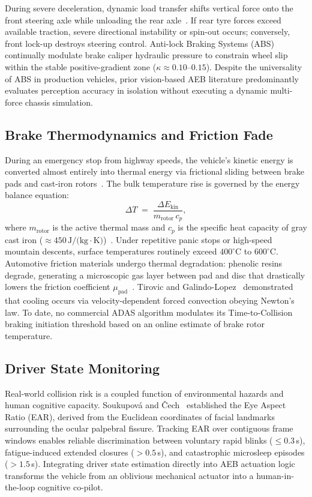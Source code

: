 \documentclass[3p,twocolumn]{elsarticle}
\begin{document}
During severe deceleration, dynamic load transfer shifts vertical force onto the front steering axle while unloading the rear axle~\cite{rajamani2011}. If rear tyre forces exceed available traction, severe directional instability or spin-out occurs; conversely, front lock-up destroys steering control. Anti-lock Braking Systems (ABS) continually modulate brake caliper hydraulic pressure to constrain wheel slip within the stable positive-gradient zone ($\kappa \approx 0.10$--$0.15$). Despite the universality of ABS in production vehicles, prior vision-based AEB literature predominantly evaluates perception accuracy in isolation without executing a dynamic multi-force chassis simulation.

\subsection{Brake Thermodynamics and Friction Fade}
During an emergency stop from highway speeds, the vehicle's kinetic energy is converted almost entirely into thermal energy via frictional sliding between brake pads and cast-iron rotors~\cite{day2014}. The bulk temperature rise is governed by the energy balance equation:
\begin{equation}
  \Delta T \;=\; \frac{\Delta E_{\text{kin}}}{m_{\text{rotor}}\,c_p},
  \label{eq:heat_energy}
\end{equation}
where $m_{\text{rotor}}$ is the active thermal mass and $c_p$ is the specific heat capacity of gray cast iron ($\approx 450\,\text{J/(kg}\cdot\text{K)}$)~\cite{tirovic2007}. Under repetitive panic stops or high-speed mountain descents, surface temperatures routinely exceed $400^\circ\text{C}$ to $600^\circ\text{C}$. Automotive friction materials undergo thermal degradation: phenolic resins degrade, generating a microscopic gas layer between pad and disc that drastically lowers the friction coefficient $\mu_{\text{pad}}$~\cite{limpert2011}. Tirovic and Galindo-Lopez~\cite{tirovic2007} demonstrated that cooling occurs via velocity-dependent forced convection obeying Newton's law. To date, no commercial ADAS algorithm modulates its Time-to-Collision braking initiation threshold based on an online estimate of brake rotor temperature.

\subsection{Driver State Monitoring}
Real-world collision risk is a coupled function of environmental hazards and human cognitive capacity. Soukupov\'a and \v{C}ech~\cite{soukupova2016} established the Eye Aspect Ratio (EAR), derived from the Euclidean coordinates of facial landmarks surrounding the ocular palpebral fissure. Tracking EAR over contiguous frame windows enables reliable discrimination between voluntary rapid blinks ($\le 0.3$\,s), fatigue-induced extended closures ($> 0.5$\,s), and catastrophic microsleep episodes ($> 1.5$\,s). Integrating driver state estimation directly into AEB actuation logic transforms the vehicle from an oblivious mechanical actuator into a human-in-the-loop cognitive co-pilot.
\end{document}
